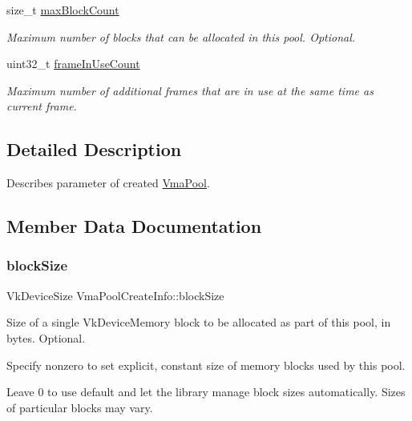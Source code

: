 \begin{DoxyCompactItemize}
size\+\_\+t \hyperlink{structVmaPoolCreateInfo_ae41142f2834fcdc82baa4883c187b75c}{max\+Block\+Count}
\begin{DoxyCompactList}\small\item\em Maximum number of blocks that can be allocated in this pool. Optional. \end{DoxyCompactList}\item 
uint32\+\_\+t \hyperlink{structVmaPoolCreateInfo_a9437e43ffbb644dbbf7fc4e50cfad6aa}{frame\+In\+Use\+Count}
\begin{DoxyCompactList}\small\item\em Maximum number of additional frames that are in use at the same time as current frame. \end{DoxyCompactList}\end{DoxyCompactItemize}


\subsection{Detailed Description}
Describes parameter of created \hyperlink{structVmaPool}{Vma\+Pool}. 

\subsection{Member Data Documentation}
\mbox{\label{structVmaPoolCreateInfo_aa4265160536cdb9be821b7686c16c676}} 
\subsubsection{\texorpdfstring{block\+Size}{blockSize}}
{\footnotesize\ttfamily Vk\+Device\+Size Vma\+Pool\+Create\+Info\+::block\+Size}



Size of a single {\ttfamily Vk\+Device\+Memory} block to be allocated as part of this pool, in bytes. Optional. 

Specify nonzero to set explicit, constant size of memory blocks used by this pool.

Leave 0 to use default and let the library manage block sizes automatically. Sizes of particular blocks may vary. \mbox{\label{structVmaPoolCreateInfo_a9437e43ffbb644dbbf7fc4e50cfad6aa}} 
